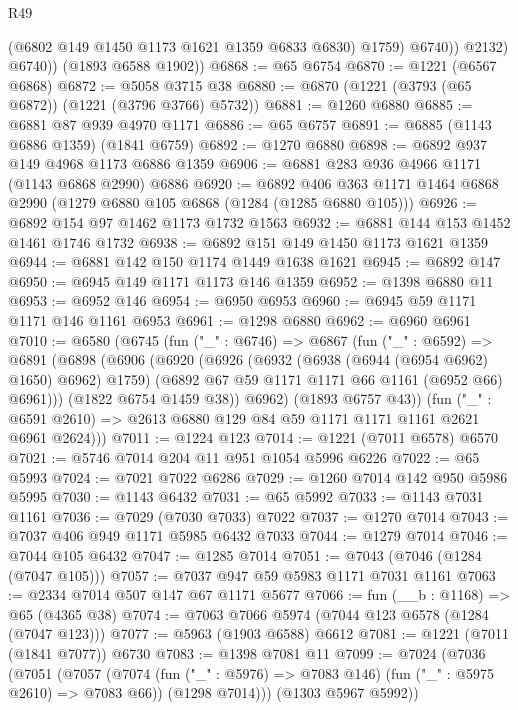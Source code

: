 \begin{lexlean}{R49}
\begin{coremodule}
                  (@6802 @149 @1450 @1173 @1621 @1359 @6833 @6830)
                  @1759)
                @6740))
            @2132)
          @6740))
      (@1893 @6588 @1902))
@6868 := @65 @6754
@6870 := @1221 (@6567 @6868)
@6872 := @5058 @3715 @38
@6880 := @6870 (@1221 (@3793 (@65 @6872)) (@1221 (@3796 @3766) @5732))
@6881 := @1260 @6880
@6885 := @6881 @87 @939 @4970 @1171
@6886 := @65 @6757
@6891 := @6885 (@1143 @6886 @1359) (@1841 @6759)
@6892 := @1270 @6880
@6898 := @6892 @937 @149 @4968 @1173 @6886 @1359
@6906 := @6881 @283 @936 @4966 @1171 (@1143 @6868 @2990) @6886
@6920 := @6892 @406 @363 @1171 @1464 @6868 @2990 (@1279 @6880 @105 @6868 (@1284 (@1285 @6880 @105)))
@6926 := @6892 @154 @97 @1462 @1173 @1732 @1563
@6932 := @6881 @144 @153 @1452 @1461 @1746 @1732
@6938 := @6892 @151 @149 @1450 @1173 @1621 @1359
@6944 := @6881 @142 @150 @1174 @1449 @1638 @1621
@6945 := @6892 @147
@6950 := @6945 @149 @1171 @1173 @146 @1359
@6952 := @1398 @6880 @11
@6953 := @6952 @146
@6954 := @6950 @6953
@6960 := @6945 @59 @1171 @1171 @146 @1161 @6953
@6961 := @1298 @6880
@6962 := @6960 @6961
@7010 := @6580
    (@6745
      (fun ("_" : @6746) =>
      @6867
        (fun ("_" : @6592) =>
        @6891
          (@6898
            (@6906
              (@6920
                (@6926
                  (@6932 (@6938 (@6944 (@6954 @6962) @1650) @6962) @1759)
                  (@6892 @67 @59 @1171 @1171 @66 @1161 (@6952 @66) @6961)))
              (@1822 @6754 @1459 @38))
            @6962)
          (@1893 @6757 @43))
        (fun ("_" : @6591 @2610) => @2613 @6880 @129 @84 @59 @1171 @1171 @1161 @2621 @6961 @2624)))
@7011 := @1224 @123
@7014 := @1221 (@7011 @6578) @6570
@7021 := @5746 @7014 @204 @11 @951 @1054 @5996 @6226
@7022 := @65 @5993
@7024 := @7021 @7022 @6286
@7029 := @1260 @7014 @142 @950 @5986 @5995
@7030 := @1143 @6432
@7031 := @65 @5992
@7033 := @1143 @7031 @1161
@7036 := @7029 (@7030 @7033) @7022
@7037 := @1270 @7014
@7043 := @7037 @406 @949 @1171 @5985 @6432 @7033
@7044 := @1279 @7014
@7046 := @7044 @105 @6432
@7047 := @1285 @7014
@7051 := @7043 (@7046 (@1284 (@7047 @105)))
@7057 := @7037 @947 @59 @5983 @1171 @7031 @1161
@7063 := @2334 @7014 @507 @147 @67 @1171 @5677
@7066 := fun (__b : @1168) => @65 (@4365 @38)
@7074 := @7063 @7066 @5974 (@7044 @123 @6578 (@1284 (@7047 @123)))
@7077 := @5963 (@1903 @6588) @6612
@7081 := @1221 (@7011 (@1841 @7077)) @6730
@7083 := @1398 @7081 @11
@7099 := @7024
    (@7036
      (@7051
        (@7057
          (@7074 (fun ("_" : @5976) => @7083 @146) (fun ("_" : @5975 @2610) => @7083 @66))
          (@1298 @7014)))
      (@1303 @5967 @5992))

\end{coremodule}
\end{lexlean}
